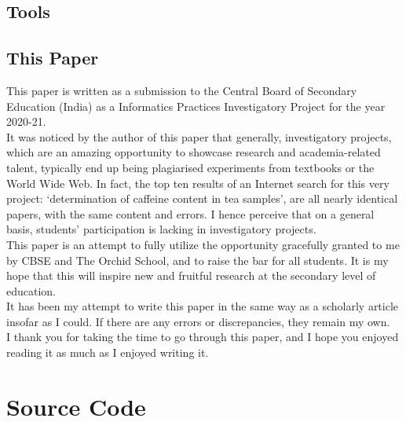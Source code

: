 \documentclass{article}
\begin{document}
\subsection{Tools}
\subsection{This Paper}
This paper is written as a submission to the Central Board of Secondary Education (India) as a
Informatics Practices Investigatory Project for the year 2020-21. \\
It was noticed by the author of this paper that generally, investigatory projects, which are an
amazing opportunity to showcase research and academia-related talent, typically end up being
plagiarised experiments from textbooks or the World Wide Web. In fact, the top ten results of
an Internet search for this very project: `determination of caffeine content in tea samples', are all
nearly identical papers, with the same content and errors. I hence perceive that on a general
basis, students' participation is lacking in investigatory projects.\\
This paper is an attempt to fully utilize the opportunity gracefully granted to me by CBSE and The
Orchid School, and to raise the bar for all students. It is my hope that this will inspire new and
fruitful research at the secondary level of education.\\
It has been my attempt to write this paper in the same way as a scholarly article insofar as I
could. If there are any errors or discrepancies, they remain my own.\\
I thank you for taking the time to go through this paper, and I hope you enjoyed reading it as much
as I enjoyed writing it.\\

\newpage

\section{Source Code}
\newpage


\printbibliography
{}
\end{document}
